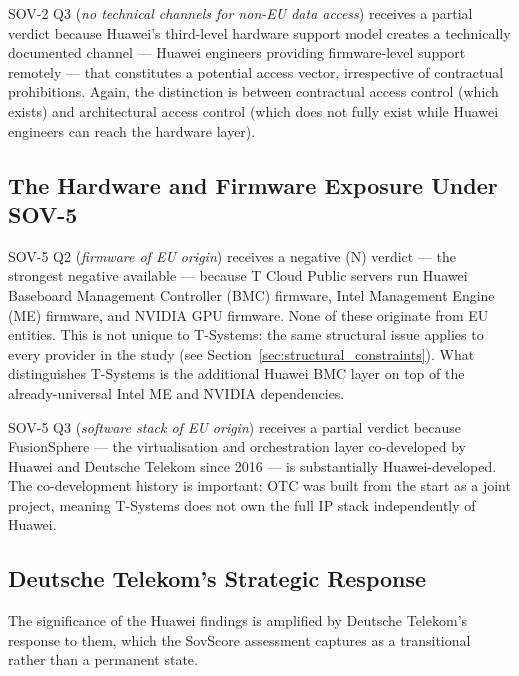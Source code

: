 SOV-2 Q3 (\emph{no technical channels for non-EU data access}) receives a partial verdict because Huawei's third-level hardware support model creates a technically documented channel — Huawei engineers providing firmware-level support remotely — that constitutes a potential access vector, irrespective of contractual prohibitions. Again, the distinction is between contractual access control (which exists) and architectural access control (which does not fully exist while Huawei engineers can reach the hardware layer).

\subsection{The Hardware and Firmware Exposure Under SOV-5}

SOV-5 Q2 (\emph{firmware of EU origin}) receives a negative (N) verdict — the strongest negative available — because T Cloud Public servers run Huawei Baseboard Management Controller (BMC) firmware, Intel Management Engine (ME) firmware, and NVIDIA GPU firmware. None of these originate from EU entities. This is not unique to T-Systems: the same structural issue applies to every provider in the study (see Section~\ref{sec:structural_constraints}). What distinguishes T-Systems is the additional Huawei BMC layer on top of the already-universal Intel ME and NVIDIA dependencies.

SOV-5 Q3 (\emph{software stack of EU origin}) receives a partial verdict because FusionSphere — the virtualisation and orchestration layer co-developed by Huawei and Deutsche Telekom since 2016 — is substantially Huawei-developed. The co-development history is important: OTC was built from the start as a joint project, meaning T-Systems does not own the full IP stack independently of Huawei.

\subsection{Deutsche Telekom's Strategic Response}

The significance of the Huawei findings is amplified by Deutsche Telekom's response to them, which the SovScore assessment captures as a transitional rather than a permanent state.

